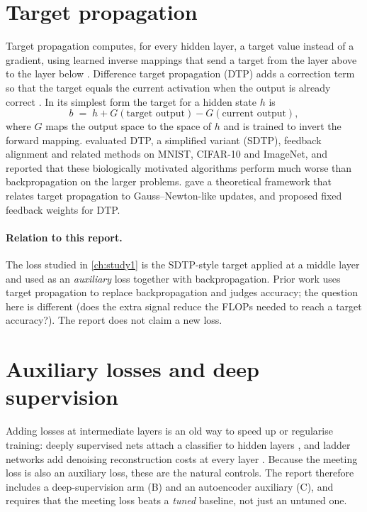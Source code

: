 \section{Target propagation}
Target propagation computes, for every hidden layer, a target value instead of a gradient, using learned inverse mappings that send a target from the layer above to the layer below \citep{bengio2014auto}. Difference target propagation (DTP) adds a correction term so that the target equals the current activation when the output is already correct \citep{lee2015dtp}. In its simplest form the target for a hidden state $h$ is
\begin{equation}
b \;=\; h + G(\text{target output}) - G(\text{current output}),
\end{equation}
where $G$ maps the output space to the space of $h$ and is trained to invert the forward mapping. \citet{bartunov2018assessing} evaluated DTP, a simplified variant (SDTP), feedback alignment and related methods on MNIST, CIFAR-10 and ImageNet, and reported that these biologically motivated algorithms perform much worse than backpropagation on the larger problems. \citet{meulemans2020theoretical} gave a theoretical framework that relates target propagation to Gauss--Newton-like updates, and \citet{shibuya2023fixed} proposed fixed feedback weights for DTP.

\paragraph{Relation to this report.} The loss studied in \cref{ch:study1} is the SDTP-style target applied at a middle layer and used as an \emph{auxiliary} loss together with backpropagation. Prior work uses target propagation to replace backpropagation and judges accuracy; the question here is different (does the extra signal reduce the FLOPs needed to reach a target accuracy?). The report does not claim a new loss.

\section{Auxiliary losses and deep supervision}
Adding losses at intermediate layers is an old way to speed up or regularise training: deeply supervised nets attach a classifier to hidden layers \citep{lee2015deeply}, and ladder networks add denoising reconstruction costs at every layer \citep{rasmus2015semi}. Because the meeting loss is also an auxiliary loss, these are the natural controls. The report therefore includes a deep-supervision arm (B) and an autoencoder auxiliary (C), and requires that the meeting loss beats a \emph{tuned} baseline, not just an untuned one.

